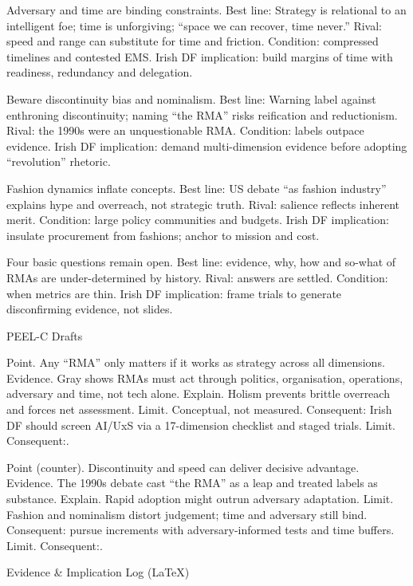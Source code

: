 Adversary and time are binding constraints.
Best line: Strategy is relational to an intelligent foe; time is unforgiving; “space we can recover, time never.”
Rival: speed and range can substitute for time and friction.
Condition: compressed timelines and contested EMS.
Irish DF implication: build margins of time with readiness, redundancy and delegation.

Beware discontinuity bias and nominalism.
Best line: Warning label against enthroning discontinuity; naming “the RMA” risks reification and reductionism.
Rival: the 1990s were an unquestionable RMA.
Condition: labels outpace evidence.
Irish DF implication: demand multi-dimension evidence before adopting “revolution” rhetoric.

Fashion dynamics inflate concepts.
Best line: US debate “as fashion industry” explains hype and overreach, not strategic truth.
Rival: salience reflects inherent merit.
Condition: large policy communities and budgets.
Irish DF implication: insulate procurement from fashions; anchor to mission and cost.

Four basic questions remain open.
Best line: evidence, why, how and so-what of RMAs are under-determined by history.
Rival: answers are settled.
Condition: when metrics are thin.
Irish DF implication: frame trials to generate disconfirming evidence, not slides.

PEEL-C Drafts

Point. Any “RMA” only matters if it works as strategy across all dimensions.
Evidence. Gray shows RMAs must act through politics, organisation, operations, adversary and time, not tech alone.
Explain. Holism prevents brittle overreach and forces net assessment.
Limit. Conceptual, not measured. Consequent: Irish DF should screen AI/UxS via a 17-dimension checklist and staged trials. Limit. Consequent:.

Point (counter). Discontinuity and speed can deliver decisive advantage.
Evidence. The 1990s debate cast “the RMA” as a leap and treated labels as substance.
Explain. Rapid adoption might outrun adversary adaptation.
Limit. Fashion and nominalism distort judgement; time and adversary still bind. Consequent: pursue increments with adversary-informed tests and time buffers. Limit. Consequent:.

Evidence & Implication Log (LaTeX)

